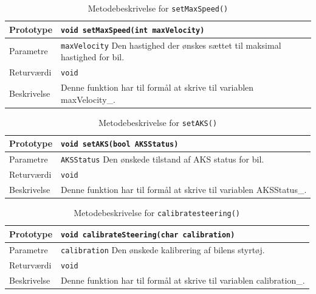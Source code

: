 \begin{table}[h]
\begin{tabularx}{\textwidth}{| L{2.5 cm} | Z |} \hline
Prototype 	& \texttt{void setMaxSpeed(int maxVelocity)} \\\hline
Parametre 	& \texttt{maxVelocity}		\newline Den hastighed der ønskes sættet til maksimal hastighed for bil.\\\hline
Returværdi	& \texttt{void} 			 \\\hline
Beskrivelse	& Denne funktion har til formål at skrive til variablen maxVelocity\_.  \\\hline
\end{tabularx}
\caption{Metodebeskrivelse for \texttt{setMaxSpeed()}}
\label{table:met_setmaxspeed}
\end{table}

\begin{table}[h]
\begin{tabularx}{\textwidth}{| L{2.5 cm} | Z |} \hline
Prototype 	& \texttt{void setAKS(bool AKSStatus)} \\\hline
Parametre 	& \texttt{AKSStatus}		\newline Den ønskede tilstand af AKS status for bil.\\\hline
Returværdi	& \texttt{void} 			 \\\hline
Beskrivelse	& Denne funktion har til formål at skrive til variablen AKSStatus\_. \\\hline
\end{tabularx}
\caption{Metodebeskrivelse for \texttt{setAKS()}}
\label{table:met_setaks}
\end{table}

\begin{table}[h!]
\begin{tabularx}{\textwidth}{| L{2.5 cm} | Z |} \hline
Prototype 	& \texttt{void calibrateSteering(char calibration)} \\\hline
Parametre 	& \texttt{calibration}		\newline Den ønskede kalibrering af bilens styrtøj.\\\hline
Returværdi	& \texttt{void} 			 \\\hline
Beskrivelse	& Denne funktion har til formål at skrive til variablen calibration\_. \\\hline
\end{tabularx}
\caption{Metodebeskrivelse for \texttt{calibratesteering()}}
\label{table:met_calibratesteering}
\end{table}

